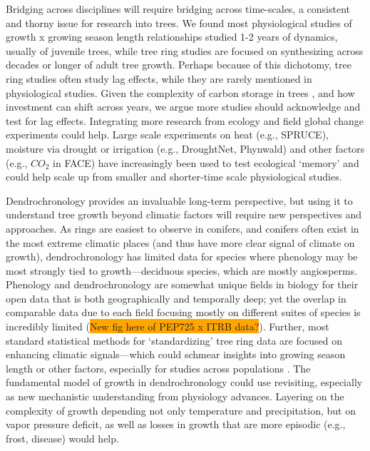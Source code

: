 \documentclass[11pt]{article}
\begin{document}
Bridging across disciplines will require bridging across time-scales, a consistent and thorny issue for research into trees. We found most physiological studies of growth x growing season length relationships studied 1-2 years of dynamics, usually of juvenile trees, while tree ring studies are focused on synthesizing across decades or longer of adult tree growth. Perhaps because of this dichotomy, tree ring studies often study lag effects, while they are rarely mentioned in physiological studies. Given the complexity of carbon storage in trees \citep{finzi2020,thompson2023no,anderson2022drives}, and how investment can shift across years, we argue more studies should acknowledge and test for lag effects. Integrating more research from ecology and field global change experiments could help. Large scale experiments on heat (e.g., SPRUCE), moisture via drought or irrigation (e.g., DroughtNet, Phynwald) and other factors (e.g., $CO_2$ in FACE) have increasingly been used to test ecological `memory' and could help scale up from smaller and shorter-time scale physiological studies.

Dendrochronology provides an invaluable long-term perspective, but using it to understand tree growth beyond climatic factors will require new perspectives and approaches. As rings are easiest to observe in conifers, and conifers often exist in the most extreme climatic places (and thus have more clear signal of climate on growth), dendrochronology has limited data for species where phenology may be most strongly tied to growth---deciduous species, which are mostly angiosperms. Phenology and dendrochronology are somewhat unique fields in biology for their open data that is both geographically and temporally deep; yet the overlap in comparable data due to each field focusing mostly on different suites of species is incredibly limited (\colorbox{orange}{New fig here of PEP725 x ITRB data?}). Further, most standard statistical methods for `standardizing' tree ring data are focused on enhancing climatic signals---which could schmear insights into growing season length or other factors, especially for studies across populations \citep{de2022temperature}. The fundamental model of growth in dendrochronology could use revisiting, especially as new mechanistic understanding from physiology advances. Layering on the complexity of growth depending not only temperature and precipitation, but on vapor pressure deficit, as well as losses in growth that are more episodic (e.g., frost, disease) would help.
\end{document}
